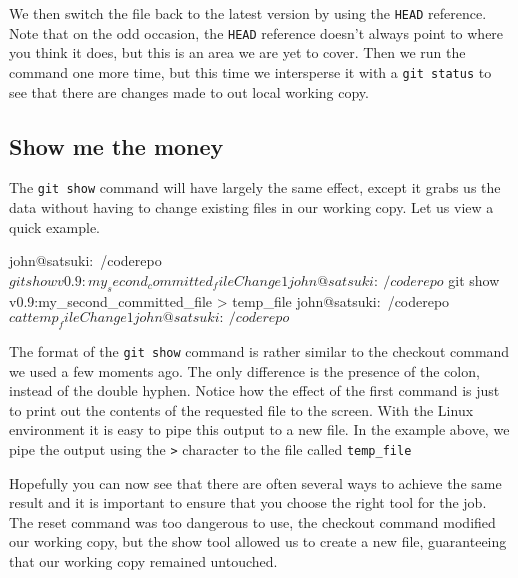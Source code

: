 We then switch the file back to the latest version by using the \texttt{HEAD} reference.  Note that on the odd occasion, the \texttt{HEAD} reference doesn't always point to where you think it does, but this is an area we are yet to cover.  Then we run the command one more time, but this time we intersperse it with a \texttt{git status} to see that there are changes made to out local working copy.

\subsection{Show me the money}
The \texttt{git show} command will have largely the same effect, except it grabs us the data without having to change existing files in our working copy.  Let us view a quick example.

\begin{code}
john@satsuki:~/coderepo$ git show v0.9:my_second_committed_file
Change1
john@satsuki:~/coderepo$ git show v0.9:my_second_committed_file > 
 temp_file
john@satsuki:~/coderepo$ cat temp_file 
Change1
john@satsuki:~/coderepo$ 
\end{code}

The format of the \texttt{git show} command is rather similar to the checkout command we used a few moments ago.  The only difference is the presence of the colon, instead of the double hyphen.  Notice how the effect of the first command is just to print out the contents of the requested file to the screen.  With the Linux environment it is easy to pipe this output to a new file.  In the example above, we pipe the output using the \texttt{>} character to the file called \texttt{temp\_file}

Hopefully you can now see that there are often several ways to achieve the same result and it is important to ensure that you choose the right tool for the job.  The reset command was too dangerous to use, the checkout command modified our working copy, but the show tool allowed us to create a new file, guaranteeing that our working copy remained untouched.

